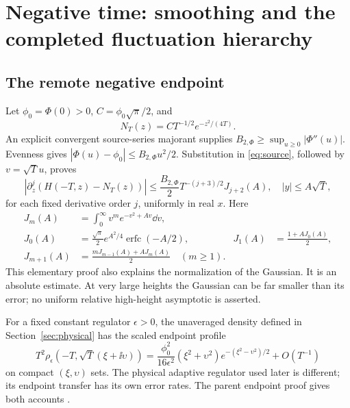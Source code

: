 \section{Negative time: smoothing and the completed fluctuation hierarchy}
\label{sec:negative}

\subsection{The remote negative endpoint}
Let $\phi_0=\Phi(0)>0$, $C=\phi_0\sqrt\pi/2$, and
\begin{equation}
 N_T(z)=C T^{-1/2}e^{-z^2/(4T)}.
 \label{eq:negative-gaussian}
\end{equation}
An explicit convergent source-series majorant supplies
$B_{2,\Phi}\ge\sup_{u\ge0}|\Phi''(u)|$. Evenness gives
$|\Phi(u)-\phi_0|\le B_{2,\Phi}u^2/2$. Substitution in
\eqref{eq:source}, followed by $v=\sqrt T u$, proves
\begin{equation}
 |\partial_z^j(H(-T,z)-N_T(z))|
 \le\frac{B_{2,\Phi}}2 T^{-(j+3)/2}J_{j+2}(A),
 \quad |y|\le A\sqrt T,
 \label{eq:negative-absolute}
\end{equation}
for each fixed derivative order $j$, uniformly in real $x$. Here
\begin{align*}
 J_m(A)&=\int_0^\infty v^m e^{-v^2+Av}\dd v,\\
 J_0(A)&=\frac{\sqrt\pi}2e^{A^2/4}\operatorname{erfc}(-A/2),
 &J_1(A)&=\frac{1+AJ_0(A)}2,\\
 J_{m+1}(A)&=\frac{mJ_{m-1}(A)+AJ_m(A)}2\quad(m\ge1).
\end{align*}
This elementary proof also explains the normalization of the Gaussian.
It is an absolute estimate. At very large heights the Gaussian can be
far smaller than its error; no uniform relative high-height asymptotic
is asserted.

For a fixed constant regulator $\epsilon>0$, the unaveraged density
defined in Section~\ref{sec:physical} has the scaled endpoint profile
\begin{equation}
 T^2\rho_{\epsilon}(-T,\sqrt T(\xi+\ii\upsilon))
 =\frac{\phi_0^2}{16\epsilon^2}(\xi^2+\upsilon^2)
       e^{-(\xi^2-\upsilon^2)/2}+O(T^{-1})
 \label{eq:negative-density-profile}
\end{equation}
on compact $(\xi,\upsilon)$ sets. The physical adaptive regulator used
later is different; its endpoint transfer has its own error rates.
The parent endpoint proof gives both accounts \cite{parent}.

